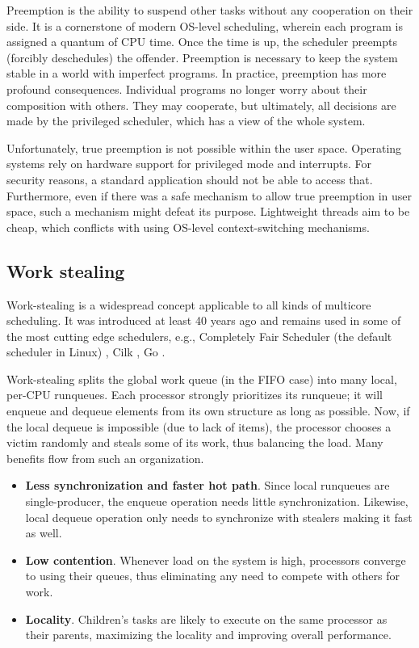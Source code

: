 \documentclass[12pt,a4paper,twoside]{report}
\begin{document}
Preemption is the ability to suspend other tasks without any cooperation on their side. It is a cornerstone of modern OS-level scheduling, wherein each program is assigned a quantum of CPU time. Once the time is up, the scheduler preempts (forcibly deschedules) the offender. Preemption is necessary to keep the system stable in a world with imperfect programs. In practice, preemption has more profound consequences. Individual programs no longer worry about their composition with others. They may cooperate, but ultimately, all decisions are made by the privileged scheduler, which has a view of the whole system.

Unfortunately, true preemption is not possible within the user space. Operating systems rely on hardware support for privileged mode and interrupts. For security reasons, a standard application should not be able to access that. Furthermore, even if there was a safe mechanism to allow true preemption in user space, such a mechanism might defeat its purpose. Lightweight threads aim to be cheap, which conflicts with using OS-level context-switching mechanisms.

\subsection{Work stealing}
\label{section:background-work-stealing}
Work-stealing is a widespread concept applicable to all kinds of multicore scheduling. It was introduced at least 40 years ago \cite{Blumofe1999} and remains used in some of the most cutting edge schedulers, e.g., Completely Fair Scheduler (the default scheduler in Linux) \cite{linux_cfs}, Cilk \cite{Blumofe1995}, Go \cite{golang}.

Work-stealing splits the global work queue (in the FIFO case) into many local, per-CPU runqueues. Each processor strongly prioritizes its runqueue; it will enqueue and dequeue elements from its own structure as long as possible. Now, if the local dequeue is impossible (due to lack of items), the processor chooses a victim randomly and steals some of its work, thus balancing the load. Many benefits flow from such an organization. 
\begin{itemize}
    \item \textbf{Less synchronization and faster hot path}. Since local runqueues are single-producer, the enqueue operation needs little synchronization. Likewise, local dequeue operation only needs to synchronize with stealers making it fast as well. 
    \item \textbf{Low contention}. Whenever load on the system is high, processors converge to using their queues, thus eliminating any need to compete with others for work.
    \item \textbf{Locality}. Children's tasks are likely to execute on the same processor as their parents, maximizing the locality and improving overall performance.
\end{itemize}
\end{document}
